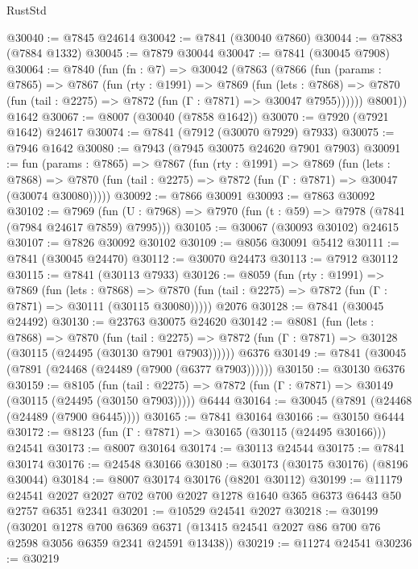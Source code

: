 \begin{lexlean}{RustStd}
\begin{coremodule}
{\begin{coremodule}
{{{{{{{{{{{{{{{{{{{{{{{{{{{{{{{{{{{{{{{{{{{{{{{{{{{{{{@30040 := @7845 @24614
@30042 := @7841 (@30040 @7860)
@30044 := @7883 (@7884 @1332)
@30045 := @7879 @30044
@30047 := @7841 (@30045 @7908)
@30064 := @7840
    (fun (fn : @7) =>
    @30042
      (@7863
        (@7866
          (fun (params : @7865) =>
          @7867
            (fun (rty : @1991) =>
            @7869
              (fun (lets : @7868) =>
              @7870 (fun (tail : @2275) => @7872 (fun (Γ : @7871) => @30047 @7955))))))
        @8001))
    @1642
@30067 := @8007 (@30040 (@7858 @1642))
@30070 := @7920 (@7921 @1642) @24617
@30074 := @7841 (@7912 (@30070 @7929) @7933)
@30075 := @7946 @1642
@30080 := @7943 (@7945 @30075 @24620 @7901 @7903)
@30091 := fun (params : @7865) =>
  @7867
    (fun (rty : @1991) =>
    @7869
      (fun (lets : @7868) =>
      @7870 (fun (tail : @2275) => @7872 (fun (Γ : @7871) => @30047 (@30074 @30080)))))
@30092 := @7866 @30091
@30093 := @7863 @30092
@30102 := @7969
    (fun (U : @7968) => @7970 (fun (t : @59) => @7978 (@7841 (@7984 @24617 @7859) @7995)))
@30105 := @30067 (@30093 @30102) @24615
@30107 := @7826 @30092 @30102
@30109 := @8056 @30091 @5412
@30111 := @7841 (@30045 @24470)
@30112 := @30070 @24473
@30113 := @7912 @30112
@30115 := @7841 (@30113 @7933)
@30126 := @8059
    (fun (rty : @1991) =>
    @7869
      (fun (lets : @7868) =>
      @7870 (fun (tail : @2275) => @7872 (fun (Γ : @7871) => @30111 (@30115 @30080)))))
    @2076
@30128 := @7841 (@30045 @24492)
@30130 := @23763 @30075 @24620
@30142 := @8081
    (fun (lets : @7868) =>
    @7870
      (fun (tail : @2275) =>
      @7872 (fun (Γ : @7871) => @30128 (@30115 (@24495 (@30130 @7901 @7903))))))
    @6376
@30149 := @7841 (@30045 (@7891 (@24468 (@24489 (@7900 (@6377 @7903))))))
@30150 := @30130 @6376
@30159 := @8105
    (fun (tail : @2275) => @7872 (fun (Γ : @7871) => @30149 (@30115 (@24495 (@30150 @7903)))))
    @6444
@30164 := @30045 (@7891 (@24468 (@24489 (@7900 @6445))))
@30165 := @7841 @30164
@30166 := @30150 @6444
@30172 := @8123 (fun (Γ : @7871) => @30165 (@30115 (@24495 @30166))) @24541
@30173 := @8007 @30164
@30174 := @30113 @24544
@30175 := @7841 @30174
@30176 := @24548 @30166
@30180 := @30173 (@30175 @30176) (@8196 @30044)
@30184 := @8007 @30174 @30176 (@8201 @30112)
@30199 := @11179
    @24541
    @2027
    @2027
    @702
    @700
    @2027
    @1278
    @1640
    @365
    @6373
    @6443
    @50
    @2757
    @6351
    @2341
@30201 := @10529 @24541 @2027
@30218 := @30199
    (@30201
      @1278
      @700
      @6369
      @6371
      (@13415 @24541 @2027 @86 @700 @76 @2598 @3056 @6359 @2341 @24591 @13438))
@30219 := @11274 @24541
@30236 := @30219
}}}}}}}}}}}}}}}}}}}}}}}}}}}}}}}}}}}}}}}}}}}}}}}}}}}}}}
\end{coremodule}}
\end{coremodule}
\end{lexlean}
